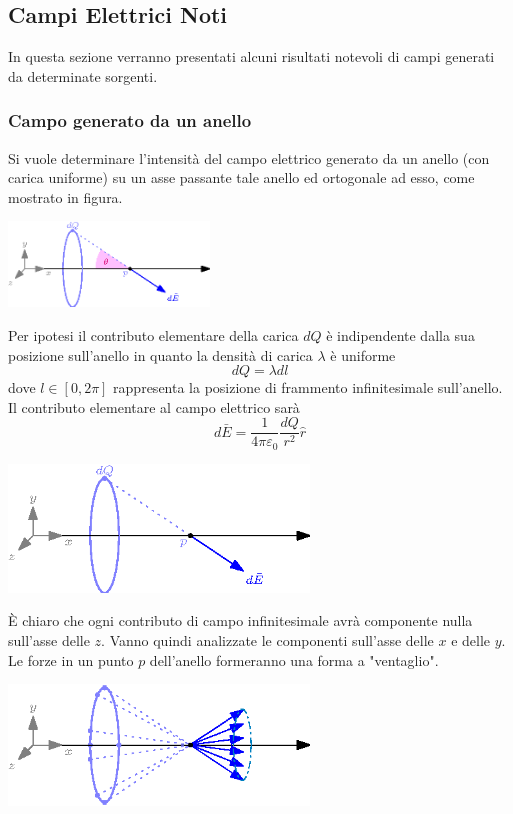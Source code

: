 \documentclass[10pt, letterpaper]{report}
\begin{document}
\subsection{Campi Elettrici Noti}
In questa sezione verranno presentati alcuni risultati notevoli di campi generati da determinate sorgenti.
\subsubsection{Campo generato da un anello}
Si vuole determinare l'intensità del campo elettrico generato da un anello (con carica uniforme) su un asse passante tale anello ed ortogonale ad esso, come mostrato in figura.
\begin{center}
    \includegraphics[width=0.4\textwidth]{images/anello1.eps}
\end{center}
Per ipotesi il contributo elementare della carica $dQ$ è indipendente dalla sua posizione sull'anello in quanto la densità di carica  $\lambda$ è uniforme $$ dQ=\lambda dl$$
dove $l\in [0,2\pi]$ rappresenta la posizione di frammento infinitesimale sull'anello. Il contributo elementare al campo elettrico sarà 
$$ d\bar E = \frac{1}{4\pi\varepsilon_0}\frac{dQ}{r^2}\hat r$$
\begin{center}
    \includegraphics[width=0.6\textwidth]{images/anello2.eps}
\end{center}
È chiaro che ogni contributo di campo infinitesimale avrà componente nulla sull'asse delle $z$. Vanno quindi analizzate le componenti sull'asse delle $x$ e delle $y$. Le forze in un punto $p$ dell'anello formeranno una forma a "ventaglio".
\begin{center}
    \includegraphics[width=0.6\textwidth]{images/anello3.eps}
\end{center}
\end{document}

